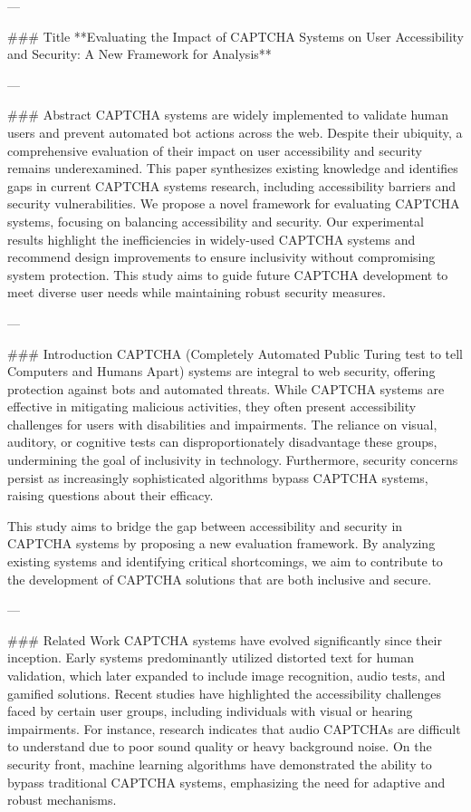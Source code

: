 ---

### Title
**Evaluating the Impact of CAPTCHA Systems on User Accessibility and Security: A New Framework for Analysis**

---

### Abstract
CAPTCHA systems are widely implemented to validate human users and prevent automated bot actions across the web. Despite their ubiquity, a comprehensive evaluation of their impact on user accessibility and security remains underexamined. This paper synthesizes existing knowledge and identifies gaps in current CAPTCHA systems research, including accessibility barriers and security vulnerabilities. We propose a novel framework for evaluating CAPTCHA systems, focusing on balancing accessibility and security. Our experimental results highlight the inefficiencies in widely-used CAPTCHA systems and recommend design improvements to ensure inclusivity without compromising system protection. This study aims to guide future CAPTCHA development to meet diverse user needs while maintaining robust security measures.

---

### Introduction
CAPTCHA (Completely Automated Public Turing test to tell Computers and Humans Apart) systems are integral to web security, offering protection against bots and automated threats. While CAPTCHA systems are effective in mitigating malicious activities, they often present accessibility challenges for users with disabilities and impairments. The reliance on visual, auditory, or cognitive tests can disproportionately disadvantage these groups, undermining the goal of inclusivity in technology. Furthermore, security concerns persist as increasingly sophisticated algorithms bypass CAPTCHA systems, raising questions about their efficacy.

This study aims to bridge the gap between accessibility and security in CAPTCHA systems by proposing a new evaluation framework. By analyzing existing systems and identifying critical shortcomings, we aim to contribute to the development of CAPTCHA solutions that are both inclusive and secure.

---

### Related Work
CAPTCHA systems have evolved significantly since their inception. Early systems predominantly utilized distorted text for human validation, which later expanded to include image recognition, audio tests, and gamified solutions. Recent studies have highlighted the accessibility challenges faced by certain user groups, including individuals with visual or hearing impairments. For instance, research indicates that audio CAPTCHAs are difficult to understand due to poor sound quality or heavy background noise. On the security front, machine learning algorithms have demonstrated the ability to bypass traditional CAPTCHA systems, emphasizing the need for adaptive and robust mechanisms.

